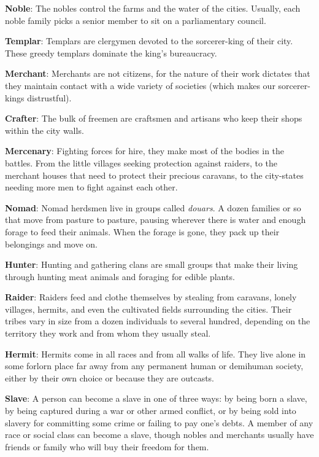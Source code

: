 \begin{itemize*}
	\item \textbf{Noble}: The nobles control the farms and the water of the cities. Usually, each noble family picks a senior member to sit on a parliamentary council.
	\item \textbf{Templar}: Templars are clergymen devoted to the sorcerer-king of their city. These greedy templars dominate the king's bureaucracy.
	\item \textbf{Merchant}: Merchants are not citizens, for the nature of their work dictates that they maintain contact with a wide variety of societies (which makes our sorcerer-kings distrustful).
	\item \textbf{Crafter}:  The bulk of freemen are craftsmen and artisans who keep their shops within the city walls.
	\item \textbf{Mercenary}: Fighting forces for hire, they make most of the bodies in the battles. From the little villages seeking protection against raiders, to the merchant houses that need to protect their precious caravans, to the city-states needing more men to fight against each other.
	\item \textbf{Nomad}: Nomad herdsmen live in groups called \textit{douars}. A dozen families or so that move from pasture to pasture, pausing wherever there is water and enough forage to feed their animals. When the forage is gone, they pack up their belongings and move on.
	\item \textbf{Hunter}: Hunting and gathering clans are small groups that make their living through hunting meat animals and foraging for edible plants.
	\item \textbf{Raider}: Raiders feed and clothe themselves by stealing from caravans, lonely villages, hermits, and even the cultivated fields surrounding the cities. Their tribes vary in size from a dozen individuals to several hundred, depending on the territory they work and from whom they usually steal.
	\item \textbf{Hermit}: Hermits come in all races and from all walks of life. They live alone in some forlorn place far away from any permanent human or demihuman society, either by their own choice or because they are outcasts.
	\item \textbf{Slave}: A person can become a slave in one of three ways: by being born a slave, by being captured during a war or other armed conflict, or by being sold into slavery for committing some crime or failing to pay one's debts. A member of any race or social class can become a slave, though nobles and merchants usually have friends or family who will buy their freedom for them.
\end{itemize*}



